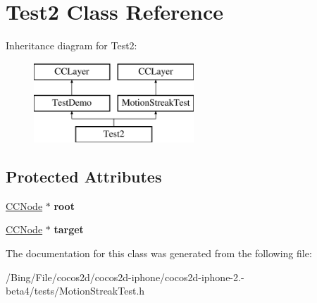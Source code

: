 \hypertarget{interface_test2}{\section{Test2 Class Reference}
\label{interface_test2}
}
Inheritance diagram for Test2\-:\begin{figure}[H]
\begin{center}
\leavevmode
\includegraphics[height=3.000000cm]{interface_test2}
\end{center}
\end{figure}
\subsection*{Protected Attributes}
\begin{DoxyCompactItemize}
\item 
\hypertarget{interface_test2_afcf3dbd2ba15653ccabf2ebe63e93842}{\hyperlink{class_c_c_node}{C\-C\-Node} $\ast$ {\bfseries root}}\label{interface_test2_afcf3dbd2ba15653ccabf2ebe63e93842}

\item 
\hypertarget{interface_test2_a62d954ba4ff6d3e7bc386f559830c964}{\hyperlink{class_c_c_node}{C\-C\-Node} $\ast$ {\bfseries target}}\label{interface_test2_a62d954ba4ff6d3e7bc386f559830c964}

\end{DoxyCompactItemize}


The documentation for this class was generated from the following file\-:\begin{DoxyCompactItemize}
\item 
/\-Bing/\-File/cocos2d/cocos2d-\/iphone/cocos2d-\/iphone-\/2.-\/beta4/tests/Motion\-Streak\-Test.\-h\end{DoxyCompactItemize}
